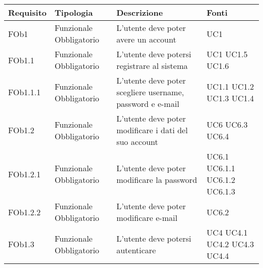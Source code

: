\begin{longtable}{|l|p{2.5cm}|p{5cm}|p{3.5cm}|}
\hline
\textbf{Requisito} & \textbf{Tipologia} & \textbf{Descrizione} & \textbf{Fonti} \\
\hline
FOb1 & Funzionale \linebreak Obbligatorio & L'utente deve poter avere un account & UC1 \linebreak \\
\hline
FOb1.1 & Funzionale \linebreak Obbligatorio & L'utente deve potersi registrare al sistema & UC1 \linebreak  UC1.5 \linebreak  UC1.6 \linebreak  \\
\hline
FOb1.1.1 & Funzionale \linebreak Obbligatorio & L'utente deve poter scegliere username, password e e-mail & UC1.1 \linebreak  UC1.2 \linebreak  UC1.3 \linebreak  UC1.4 \linebreak  \\
\hline
FOb1.2 & Funzionale \linebreak Obbligatorio & L'utente deve poter modificare i dati del suo account & UC6 \linebreak  UC6.3 \linebreak  UC6.4 \linebreak  \\
\hline
FOb1.2.1 & Funzionale \linebreak Obbligatorio & L'utente deve poter modificare la password & UC6.1 \linebreak  UC6.1.1 \linebreak  UC6.1.2 \linebreak  UC6.1.3 \linebreak  \\
\hline
FOb1.2.2 & Funzionale \linebreak Obbligatorio & L'utente deve poter modificare e-mail & UC6.2 \linebreak  \\
\hline
FOb1.3 & Funzionale \linebreak Obbligatorio & L'utente deve potersi autenticare & UC4 \linebreak  UC4.1 \linebreak  UC4.2 \linebreak  UC4.3 \linebreak  UC4.4 \linebreak  \\

\end{longtable}

